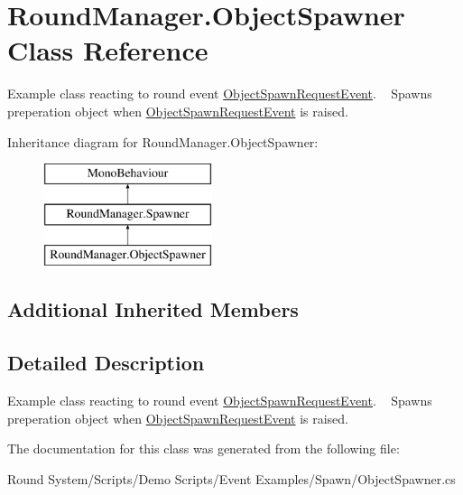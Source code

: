 \hypertarget{class_round_manager_1_1_object_spawner}{}\section{Round\+Manager.\+Object\+Spawner Class Reference}
\label{class_round_manager_1_1_object_spawner}


Example class reacting to round event \hyperlink{class_round_manager_1_1_events_1_1_object_spawn_request_event}{Object\+Spawn\+Request\+Event}. ~\newline
Spawns preperation object when \hyperlink{class_round_manager_1_1_events_1_1_object_spawn_request_event}{Object\+Spawn\+Request\+Event} is raised. ~\newline
 


Inheritance diagram for Round\+Manager.\+Object\+Spawner\+:\begin{figure}[H]
\begin{center}
\leavevmode
\includegraphics[height=3.000000cm]{class_round_manager_1_1_object_spawner}
\end{center}
\end{figure}
\subsection*{Additional Inherited Members}


\subsection{Detailed Description}
Example class reacting to round event \hyperlink{class_round_manager_1_1_events_1_1_object_spawn_request_event}{Object\+Spawn\+Request\+Event}. ~\newline
Spawns preperation object when \hyperlink{class_round_manager_1_1_events_1_1_object_spawn_request_event}{Object\+Spawn\+Request\+Event} is raised. ~\newline




The documentation for this class was generated from the following file\+:\begin{DoxyCompactItemize}
\item 
Round System/\+Scripts/\+Demo Scripts/\+Event Examples/\+Spawn/Object\+Spawner.\+cs\end{DoxyCompactItemize}
